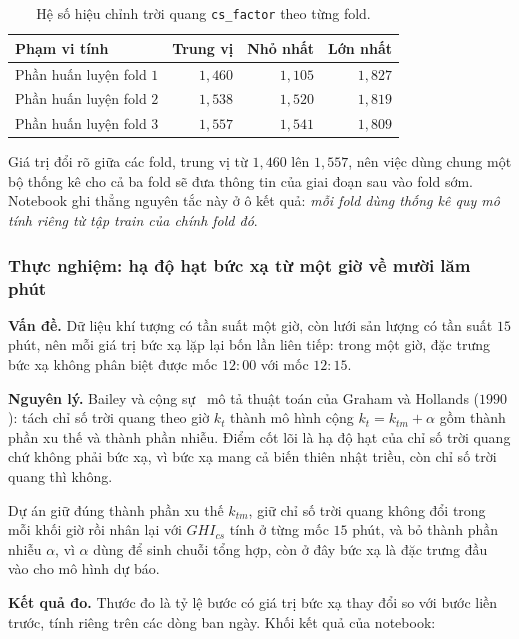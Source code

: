 \documentclass[12pt, a4paper]{report}
\begin{document}
\begin{table}[htbp]
\centering
\caption{Hệ số hiệu chỉnh trời quang \texttt{cs\_factor} theo từng fold.}
\label{tab:cs_factor}
\small
\begin{tabular}{l r r r}
\toprule
\textbf{Phạm vi tính} & \textbf{Trung vị} & \textbf{Nhỏ nhất} & \textbf{Lớn nhất} \\
\midrule
Phần huấn luyện fold $1$ & $1{,}460$ & $1{,}105$ & $1{,}827$ \\
Phần huấn luyện fold $2$ & $1{,}538$ & $1{,}520$ & $1{,}819$ \\
Phần huấn luyện fold $3$ & $1{,}557$ & $1{,}541$ & $1{,}809$ \\
\bottomrule
\end{tabular}
\end{table}

Giá trị đổi rõ giữa các fold, trung vị từ $1{,}460$ lên $1{,}557$, nên việc dùng chung
một bộ thống kê cho cả ba fold sẽ đưa thông tin của giai đoạn sau vào fold sớm. Notebook ghi
thẳng nguyên tắc này ở ô kết quả: \textit{mỗi fold dùng thống kê quy mô tính riêng từ tập
train của chính fold đó}.

\subsubsection{Thực nghiệm: hạ độ hạt bức xạ từ một giờ về mười lăm phút}

\textbf{Vấn đề.} Dữ liệu khí tượng có tần suất một giờ, còn lưới sản lượng có tần suất $15$
phút, nên mỗi giá trị bức xạ lặp lại bốn lần liên tiếp: trong một giờ, đặc trưng bức xạ không
phân biệt được mốc $12{:}00$ với mốc $12{:}15$.

\textbf{Nguyên lý.} Bailey và cộng sự~\cite{bailey2024} mô tả thuật toán của Graham và
Hollands ($1990$): tách chỉ số trời quang theo giờ $k_t$ thành mô hình cộng
$k_t = k_{tm} + \alpha$ gồm thành phần xu thế và thành phần nhiễu. Điểm cốt lõi là hạ độ hạt của chỉ số trời quang chứ không phải bức xạ, vì bức xạ mang cả biến thiên nhật
triều, còn chỉ số trời quang thì không.

Dự án giữ đúng thành phần xu thế $k_{tm}$, giữ chỉ số trời quang không đổi trong mỗi khối
giờ rồi nhân lại với $GHI_{cs}$ tính ở từng mốc $15$ phút, và bỏ thành phần nhiễu $\alpha$,
vì $\alpha$ dùng để sinh chuỗi tổng hợp, còn ở đây bức xạ là đặc trưng đầu vào cho mô hình
dự báo.

\textbf{Kết quả đo.} Thước đo là tỷ lệ bước có giá trị bức xạ thay đổi so với bước liền
trước, tính riêng trên các dòng ban ngày. Khối kết quả của notebook:
\end{document}
